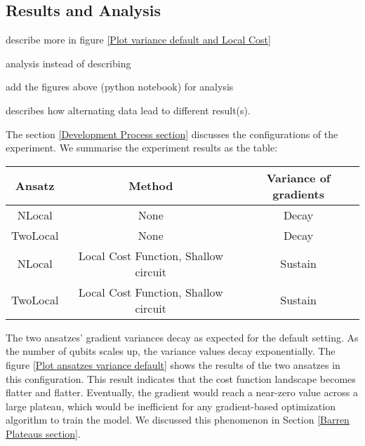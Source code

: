 \subsection{Results and Analysis}

\begin{todolist}
\item describe more in figure \ref{Plot variance default and Local Cost}
\item analysis instead of describing
\item add the figures above (python notebook) for analysis
\item describes how alternating data lead to different result(s).
\end{todolist}

The section \ref{Development Process section} discusses the configurations of the experiment. 
We summarise the experiment results as the table:
\begin{center}
    \begin{tabular}{|| c c c ||}
        \hline
        Ansatz      & Method                                & Variance of gradients \\[0.5ex] 
        \hline \hline
        NLocal      & None                                  & Decay                 \\
        \hline
        TwoLocal    & None                                  & Decay                 \\
        \hline
        NLocal      & Local Cost Function, Shallow circuit  & Sustain               \\
        \hline
        TwoLocal    & Local Cost Function, Shallow circuit  & Sustain               \\
        \hline
    \end{tabular}
\end{center}

The two ansatzes' gradient variances decay as expected for the default setting.
As the number of qubits scales up, the variance values decay exponentially. 
The figure \ref{Plot ansatzes variance default} shows the results of the two ansatzes in this configuration.
This result indicates that the cost function landscape becomes flatter and flatter. 
Eventually, the gradient would reach a near-zero value across a large plateau, which would be inefficient for any gradient-based optimization algorithm to train the model.
We discussed this phenomenon in Section \ref{Barren Plateaus section}.



